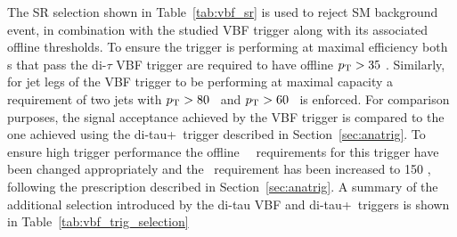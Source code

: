 		The \ac{SR} selection shown in Table~\ref{tab:vbf_sr} is used to reject \ac{SM} background event, in combination with the studied \ac{VBF} trigger along with its associated offline thresholds.
		To ensure the trigger is performing at maximal efficiency both \ltau s that pass the di-$\tau$ \ac{VBF} trigger are required to have offline $p_{\mathrm{T}} > 35$ \gev. Similarly, for jet legs of the \ac{VBF} trigger to be performing at maximal capacity a requirement of two jets with $p_{\mathrm{T}} > 80$ \gev\  and $p_{\mathrm{T}} > 60$ \gev\ is enforced.
		For comparison purposes, the signal acceptance achieved by the \ac{VBF} trigger is compared to the one achieved using the di-tau+\met\ trigger described in Section~\ref{sec:anatrig}. To ensure high trigger performance the offline \ltau\ \pt\ requirements for this trigger have been changed appropriately and the \met\ requirement has been increased to 150 \gev, following the prescription described in Section~\ref{sec:anatrig}. A summary of the additional selection introduced by the di-tau \ac{VBF}  and di-tau+\met\ triggers is shown in Table~\ref{tab:vbf_trig_selection}
